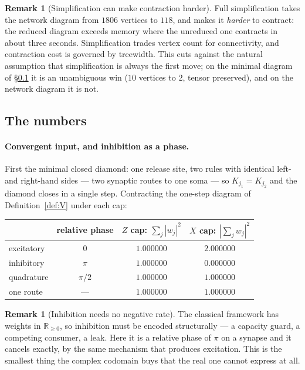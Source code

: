 \documentclass[11pt]{article}
\theoremstyle{definition}
\newtheorem{remark}[definition]{Remark}
\theoremstyle{plain}
\begin{document}
\begin{remark}[Simplification can make contraction harder]\label{rem:reduce}
Full simplification takes the network diagram from $1806$ vertices to $118$, and
makes it \emph{harder} to contract: the reduced diagram exceeds memory where the
unreduced one contracts in about three seconds. Simplification trades vertex
count for connectivity, and contraction cost is governed by treewidth. This cuts
against the natural assumption that simplification is always the first move; on
the minimal diagram of \S\ref{ssec:numbers} it is an unambiguous win ($10$
vertices to $2$, tensor preserved), and on the network diagram it is not.
\end{remark}

\subsection{The numbers}\label{ssec:numbers}

\paragraph{Convergent input, and inhibition as a phase.}
First the minimal closed diamond: one release site, two rules with identical
left- and right-hand sides --- two synaptic routes to one soma --- so
$K_{j_1} = K_{j_2}$ and the diamond closes in a single step. Contracting the
one-step diagram of Definition~\ref{def:V} under each cap:

\begin{center}
\small
\begin{tabular}{@{}lccc@{}}
\toprule
& relative phase & $Z$ cap: $\sum_j |w_j|^2$ & $X$ cap: $|\sum_j w_j|^2$ \\
\midrule
excitatory   & $0$       & $1.000000$ & $2.000000$ \\
inhibitory   & $\pi$     & $1.000000$ & $0.000000$ \\
quadrature   & $\pi/2$   & $1.000000$ & $1.000000$ \\
one route    & ---       & $1.000000$ & $1.000000$ \\
\bottomrule
\end{tabular}
\end{center}

\begin{remark}[Inhibition needs no negative rate]\label{rem:inhibition}
The classical framework has weights in $\mathbb{R}_{\geq 0}$, so inhibition must
be encoded structurally --- a capacity guard, a competing consumer, a leak.
Here it is a relative phase of $\pi$ on a synapse and it cancels exactly, by the
same mechanism that produces excitation. This is the smallest thing the complex
codomain buys that the real one cannot express at all.
\end{remark}
\end{document}
